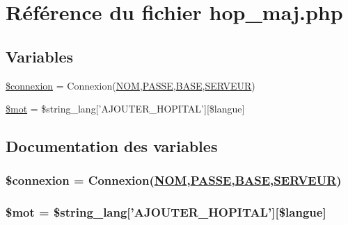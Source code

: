 \hypertarget{hop__maj_8php}{
\section{R\'{e}f\'{e}rence du fichier hop\_\-maj.php}
\label{hop__maj_8php}
}
\subsection*{Variables}
\begin{CompactItemize}
\item 
\hyperlink{hop__maj_8php_a0}{\$connexion} = Connexion(\hyperlink{pma__connect_8php_a0}{NOM},\hyperlink{pma__connect_8php_a1}{PASSE},\hyperlink{pma__connect_8php_a3}{BASE},\hyperlink{pma__connect_8php_a2}{SERVEUR})
\item 
\hyperlink{hop__maj_8php_a1}{\$mot} = \$string\_\-lang\mbox{[}'AJOUTER\_\-HOPITAL'\mbox{]}\mbox{[}\$langue\mbox{]}
\end{CompactItemize}


\subsection{Documentation des variables}
\hypertarget{hop__maj_8php_a0}{
\subsubsection[\$connexion]{\setlength{\rightskip}{0pt plus 5cm}\$connexion = Connexion(\hyperlink{pma__connect_8php_a0}{NOM},\hyperlink{pma__connect_8php_a1}{PASSE},\hyperlink{pma__connect_8php_a3}{BASE},\hyperlink{pma__connect_8php_a2}{SERVEUR})}}
\label{hop__maj_8php_a0}


\hypertarget{hop__maj_8php_a1}{
\subsubsection[\$mot]{\setlength{\rightskip}{0pt plus 5cm}\$mot = \$string\_\-lang\mbox{[}'AJOUTER\_\-HOPITAL'\mbox{]}\mbox{[}\$langue\mbox{]}}}
\label{hop__maj_8php_a1}


